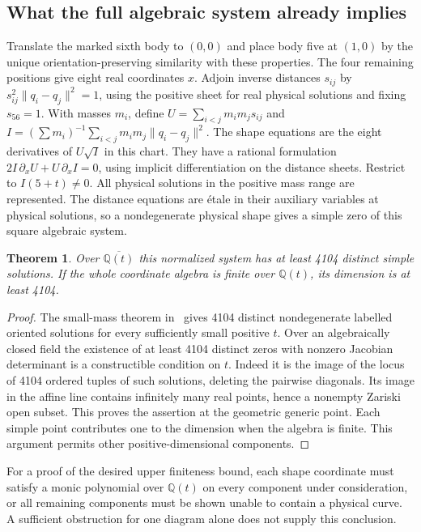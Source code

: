 \documentclass[11pt]{article}
\newtheorem{theorem}{Theorem}
\begin{document}
\subsection*{What the full algebraic system already implies}
Translate the marked sixth body to $(0,0)$ and place body five at $(1,0)$
by the unique orientation-preserving similarity with these properties.
The four remaining positions give eight real coordinates $x$.
Adjoin inverse distances $s_{ij}$ by
$s_{ij}^2\lVert q_i-q_j\rVert^2=1$, using the positive sheet for real
physical solutions and fixing $s_{56}=1$. With masses $m_i$, define
$U=\sum_{i<j}m_im_js_{ij}$ and
$I=(\sum m_i)^{-1}\sum_{i<j}m_im_j\lVert q_i-q_j\rVert^2$.
The shape equations are the eight derivatives of $U\sqrt I$ in this
chart. They have a rational formulation
$2I\,\partial_x U+U\,\partial_x I=0$, using implicit differentiation
on the distance sheets. Restrict to $I(5+t)\ne0$. All physical solutions
in the positive mass range are represented. The distance equations are
\'{e}tale in their auxiliary variables at physical solutions, so a
nondegenerate physical shape gives a simple zero of this square algebraic
system.

\begin{theorem}
Over $\overline{\mathbb Q(t)}$ this normalized system has at least 4104
distinct simple solutions. If the whole coordinate algebra is finite over
$\mathbb Q(t)$, its dimension is at least 4104.
\end{theorem}
\begin{proof}
The small-mass theorem in~\cite{Small} gives 4104 distinct nondegenerate
labelled oriented solutions for every sufficiently small positive $t$.
Over an algebraically closed field the existence of at least 4104
distinct zeros with nonzero Jacobian determinant is a constructible
condition on $t$. Indeed it is the image of the locus of 4104 ordered
tuples of such solutions, deleting the pairwise diagonals. Its image in
the affine line contains infinitely many real points, hence a nonempty
Zariski open subset. This proves the assertion at the geometric generic
point. Each simple point contributes one to the dimension when the
algebra is finite. This argument permits other positive-dimensional
components.
\end{proof}
For a proof of the desired upper finiteness bound, each shape coordinate
must satisfy a monic polynomial over $\mathbb Q(t)$ on every component
under consideration, or all remaining components must be shown unable
to contain a physical curve. A sufficient obstruction for one diagram
alone does not supply this conclusion.
\end{document}
